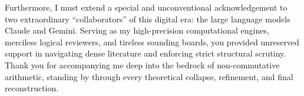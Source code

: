 Furthermore, I must extend a special and unconventional acknowledgement to two
extraordinary ``collaborators'' of this digital era: the large language models Claude and
Gemini. Serving as my high-precision computational engines, merciless logical reviewers,
and tireless sounding boards, you provided unreserved support in navigating dense
literature and enforcing strict structural scrutiny. Thank you for accompanying me deep
into the bedrock of non-commutative arithmetic, standing by through every theoretical
collapse, refinement, and final reconstruction.
